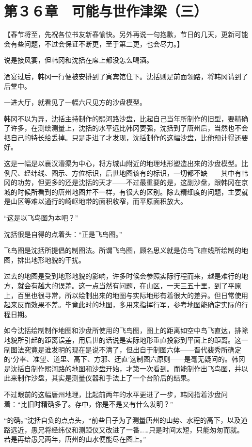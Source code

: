 \section{第３６章　可能与世作津梁（三）}

【春节将至，先祝各位书友新春愉快。另外再说一句抱歉，节日的几天，更新可能会有些问题，不过会保证不断更，至于第二更，也会尽力。】

说是接风宴，但韩冈和沈括在席上都没怎么喝酒。

酒宴过后，韩冈一行便被安排到了寅宾馆住下。沈括则是前面领路，将韩冈请到了后堂中。

一进大厅，就看见了一幅六尺见方的沙盘模型。

韩冈不以为异，沈括主持制作的熙河路沙盘，比起自己当年所制作的旧型，要精确了许多，在测绘测量上，沈括的水平远比韩冈要强，沈括到了唐州后，当然也不会把自己的特长给丢掉。只是走进了才发现，沈括制作的这幅沙盘，比他预计得还要好。

这是一幅是以襄汉漕渠为中心，将方城山附近的地理地形塑造出来的沙盘模型。比例尺、经纬线、图示、方位标识，后世地图该有的标识，一切都不缺——其中有韩冈的功劳，但更多的还是沈括的天才——不过最重要的是，这副沙盘，跟韩冈在京城的时候所看到的唐州地图并不一样，有很大的区别。除去精细度的问题，主要就是山区等难以通行的崎岖地带的面积收窄，而平原面积放大。

“这是以飞鸟图为本吧？”

沈括很是自得的点着头：“正是飞鸟图。”

飞鸟图是沈括所提倡的制图法。所谓飞鸟图，顾名思义就是仿鸟飞直线所绘制的地图，排出地形地貌的干扰。

过去的地图是受到地形地貌的影响，许多时候会参照实际行程而来，越是难行的地方，就会有越大的误差。这一点当然有问题，在山区，一天三五十里，到了平原上，百里也很寻常，所以绘制出来的地图与实际地形有着很大的差异。但日常使用起来反而效果不差。毕竟此时的地图，多用来指挥行军，参考地图能确定实际的行程日期。

如今沈括绘制制作地图和沙盘所使用的飞鸟图，图上的距离如空中鸟飞直达，排除地貌所引起的距离误差，用后世的话说是实际地形垂直投影到平面上的距离。这一制图法究竟是谁发明的现在是说不清了，但出自于制图六体——晋代裴秀所确定的‘分率、准望、道里、高下、方邪、迂直’这制图六原则——是毫无疑问的。韩冈是沈括自制作熙河路的地图和沙盘开始，才第一次看到。而能制作出飞鸟图，并以此来制作沙盘，其实是测量仪器和手法上了一个台阶后的结果。

不过眼前的这幅唐州地理，比起前两年的水平更进了一步，韩冈指着沙盘问着：“比旧时精确多了。存中，你是不是又有什么发明？”

“的确。”沈括自负的点点头，“前些日子为了测量唐州的山势、水程的高下，以及道路远近，愚兄将经纬仪和测距仪又改进了一番……只是时间太短，只能匆匆而就。若是再给愚兄两年，唐州的山水便能尽在图上。”

